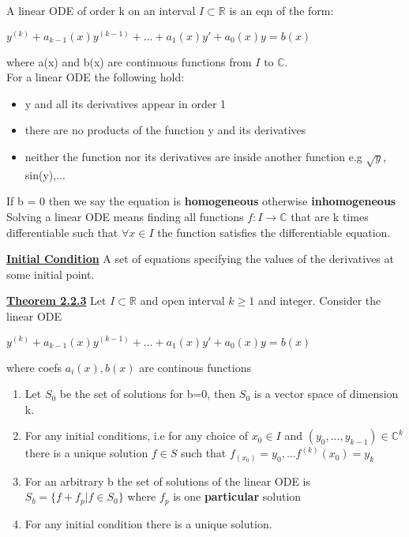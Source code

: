 \documentclass[8pt]{extreport}
\begin{document}
A linear ODE of order k on an interval $I \subset \mathbb{R}$ is an eqn of the form:
\begin{center}
$y^{(k)} + a_{k-1}(x)y^{(k-1)} + ... + a_1(x)y' + a_0(x)y = b(x)$
\end{center}
where a(x) and b(x) are continuous functions from $I \text{ to } \mathbb{C}$.\\
For a linear ODE the following hold:
\begin{itemize}
\item y and all its derivatives appear in order 1
\item there are no products of the function y  and its derivatives
\item neither the function nor its derivatives are inside another function e.g $\sqrt{y}$, sin(y),...
\end{itemize}
If b = 0 then we say the equation is \textbf{homogeneous} otherwise \textbf{inhomogeneous}\\


Solving a linear ODE means finding all functions $f:I \rightarrow \mathbb{C}$ that are k times differentiable such that $\forall x \in  I$ the function satisfies the differentiable equation.

\textbf{\underline{Initial Condition}} A set of equations specifying the values of the derivatives at some initial point. 

\underline{\textbf{Theorem 2.2.3}} Let $I\subset \mathbb{R}$ and open interval $k\geq 1$ and integer. Consider the linear ODE
\begin{center}
$y^{(k)} + a_{k-1}(x)y^{(k-1)} + ... + a_1(x)y' + a_0(x)y = b(x)$
\end{center}
where coefs $a_i(x), b(x)$ are continous functions
\begin{enumerate}
\item Let $S_0$ be the set of solutions for b=0, then $S_0$ is a vector space of dimension k.
\item For any initial conditions, i.e for any choice of $x_0 \in I$ and $(y_0,...,y_{k-1}) \in \mathbb{C}^k$ there is a unique solution $f \in S$ such that $f_(x_0) = y_0, ... f^{(k)}(x_0)= y_k$
\item For an arbitrary b the set of solutions of the linear ODE is $S_b = \{f + f_p | f \in S_0\}$ where $f_p$ is one \textbf{particular} solution
\item For any initial condition there is a unique solution.
  
\end{enumerate}
\end{document}
